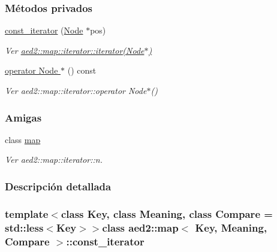 \subsubsection*{\-Métodos privados}
\begin{DoxyCompactItemize}
\item 
\hyperlink{classaed2_1_1map_1_1const__iterator_a195d395708167dca23f9ce49f7c604f3_a195d395708167dca23f9ce49f7c604f3}{const\-\_\-iterator} (\hyperlink{structaed2_1_1map_1_1Node}{\-Node} $\ast$pos)
\begin{DoxyCompactList}\small\item\em \-Ver \hyperlink{classaed2_1_1map_1_1iterator_ab0ea21abcb32b6d5a72cf341b9029838_ab0ea21abcb32b6d5a72cf341b9029838}{aed2\-::map\-::iterator\-::iterator(\-Node$\ast$)} \end{DoxyCompactList}\item 
\hyperlink{classaed2_1_1map_1_1const__iterator_a637c0f083a23ec4a262d47baeecafcf3_a637c0f083a23ec4a262d47baeecafcf3}{operator Node $\ast$} () const 
\begin{DoxyCompactList}\small\item\em \-Ver aed2\-::map\-::iterator\-::operator \-Node$\ast$() \end{DoxyCompactList}\end{DoxyCompactItemize}
\subsubsection*{\-Amigas}
\begin{DoxyCompactItemize}
\item 
class \hyperlink{classaed2_1_1map_1_1const__iterator_aeda338414e516b47761f994fb78056c6_aeda338414e516b47761f994fb78056c6}{map}
\begin{DoxyCompactList}\small\item\em \-Ver aed2\-::map\-::iterator\-::n. \end{DoxyCompactList}\end{DoxyCompactItemize}


\subsubsection{\-Descripción detallada}
\subsubsection*{template$<$class \-Key, class \-Meaning, class \-Compare = std\-::less$<$\-Key$>$$>$class aed2\-::map$<$ Key, Meaning, Compare $>$\-::const\-\_\-iterator}


